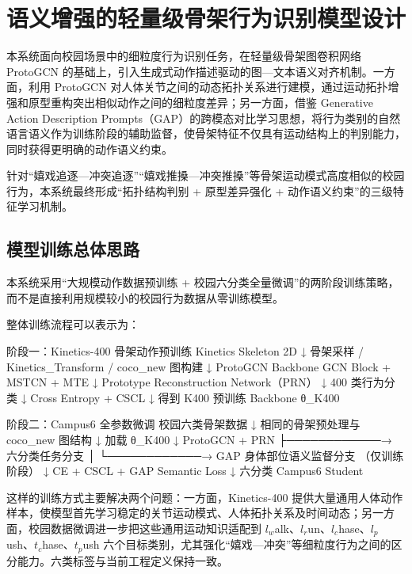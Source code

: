 \chapter{语义增强的轻量级骨架行为识别模型设计}

本系统面向校园场景中的细粒度行为识别任务，在轻量级骨架图卷积网络 ProtoGCN 的基础上，引入生成式动作描述驱动的图—文本语义对齐机制。一方面，利用 ProtoGCN 对人体关节之间的动态拓扑关系进行建模，通过运动拓扑增强和原型重构突出相似动作之间的细粒度差异；另一方面，借鉴 Generative Action Description Prompts（GAP）的跨模态对比学习思想，将行为类别的自然语言语义作为训练阶段的辅助监督，使骨架特征不仅具有运动结构上的判别能力，同时获得更明确的动作语义约束。

针对“嬉戏追逐—冲突追逐”“嬉戏推搡—冲突推搡”等骨架运动模式高度相似的校园行为，本系统最终形成“拓扑结构判别 + 原型差异强化 + 动作语义约束”的三级特征学习机制。

\section{模型训练总体思路}

本系统采用“大规模动作数据预训练 + 校园六分类全量微调”的两阶段训练策略，而不是直接利用规模较小的校园行为数据从零训练模型。

整体训练流程可以表示为：

\begin{NotionCode}
阶段一：Kinetics-400 骨架动作预训练
Kinetics Skeleton 2D
        ↓
骨架采样 / Kinetics_Transform / coco_new 图构建
        ↓
ProtoGCN Backbone
GCN Block + MSTCN + MTE
        ↓
Prototype Reconstruction Network（PRN）
        ↓
400 类行为分类
        ↓
Cross Entropy + CSCL
        ↓
得到 K400 预训练 Backbone θ_K400


阶段二：Campus6 全参数微调
校园六类骨架数据
        ↓
相同的骨架预处理与 coco_new 图结构
        ↓
加载 θ_K400
        ↓
ProtoGCN + PRN
        ├────────────→ 六分类任务分支
        │
        └────────────→ GAP 身体部位语义监督分支
                         （仅训练阶段）
        ↓
CE + CSCL + GAP Semantic Loss
        ↓
六分类 Campus6 Student
\end{NotionCode}

这样的训练方式主要解决两个问题：一方面，Kinetics-400 提供大量通用人体动作样本，使模型首先学习稳定的关节运动模式、人体拓扑关系及时间动态；另一方面，校园数据微调进一步把这些通用运动知识适配到 \(l_w\)alk、\(l_r\)un、\(l_c\)hase、\(l_p\)ush、\(t_c\)hase、\(t_p\)ush 六个目标类别，尤其强化“嬉戏—冲突”等细粒度行为之间的区分能力。六类标签与当前工程定义保持一致。

